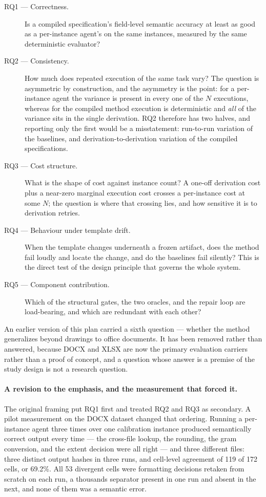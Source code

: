 \begin{description}
  \item[RQ1 --- Correctness.] Is a compiled specification's field-level semantic accuracy at
    least as good as a per-instance agent's on the same instances, measured by the same
    deterministic evaluator?
  \item[RQ2 --- Consistency.] How much does repeated execution of the same task vary? The
    question is asymmetric by construction, and the asymmetry is the point: for a
    per-instance agent the variance is present in every one of the $N$ executions, whereas
    for the compiled method execution is deterministic and \emph{all} of the variance sits in
    the single derivation. RQ2 therefore has two halves, and reporting only the first would
    be a misstatement: run-to-run variation of the baselines, and derivation-to-derivation
    variation of the compiled specifications.
  \item[RQ3 --- Cost structure.] What is the shape of cost against instance count? A one-off
    derivation cost plus a near-zero marginal execution cost crosses a per-instance cost at
    some $N$; the question is where that crossing lies, and how sensitive it is to derivation
    retries.
  \item[RQ4 --- Behaviour under template drift.] When the template changes underneath a
    frozen artifact, does the method fail loudly and locate the change, and do the baselines
    fail silently? This is the direct test of the design principle that governs the whole
    system.
  \item[RQ5 --- Component contribution.] Which of the structural gates, the two oracles, and
    the repair loop are load-bearing, and which are redundant with each other?
\end{description}

An earlier version of this plan carried a sixth question --- whether the method generalizes
beyond drawings to office documents. It has been removed rather than answered, because DOCX
and XLSX are now the primary evaluation carriers rather than a proof of concept, and a
question whose answer is a premise of the study design is not a research question.

\paragraph{A revision to the emphasis, and the measurement that forced it.}
The original framing put RQ1 first and treated RQ2 and RQ3 as secondary. A pilot measurement
on the DOCX dataset changed that ordering. Running a per-instance agent three times over one
calibration instance produced semantically correct output every time --- the cross-file
lookup, the rounding, the gram conversion, and the extent decision were all right --- and
three different files: three distinct output hashes in three runs, and cell-level agreement
of 119 of 172 cells, or 69.2\%. All 53 divergent cells were formatting decisions retaken from
scratch on each run, a thousands separator present in one run and absent in the next, and
none of them was a semantic error.

